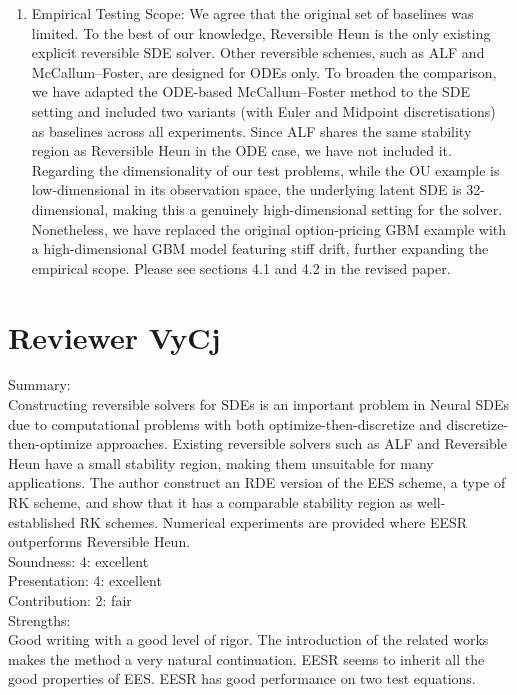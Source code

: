 \documentclass{article}
\begin{document}
\begin{enumerate}
    \item Empirical Testing Scope: We agree that the original set of baselines was limited. To the best of our knowledge, Reversible Heun is the only existing explicit reversible SDE solver. Other reversible schemes, such as ALF and McCallum–Foster, are designed for ODEs only. To broaden the comparison, we have adapted the ODE-based McCallum–Foster method to the SDE setting and included two variants (with Euler and Midpoint discretisations) as baselines across all experiments. Since ALF shares the same stability region as Reversible Heun in the ODE case, we have not included it. Regarding the dimensionality of our test problems, while the OU example is low-dimensional in its observation space, the underlying latent SDE is 32-dimensional, making this a genuinely high-dimensional setting for the solver. Nonetheless, we have replaced the original option-pricing GBM example with a high-dimensional GBM model featuring stiff drift, further expanding the empirical scope. Please see sections 4.1 and 4.2 in the revised paper.
\end{enumerate}

\section{Reviewer VyCj}

Summary:\\
Constructing reversible solvers for SDEs is an important problem in Neural SDEs due to computational problems with both optimize-then-discretize and discretize-then-optimize approaches. Existing reversible solvers such as ALF and Reversible Heun have a small stability region, making them unsuitable for many applications. The author construct an RDE version of the EES scheme, a type of RK scheme, and show that it has a comparable stability region as well-established RK schemes. Numerical experiments are provided where EESR outperforms Reversible Heun.\\

Soundness: 4: excellent\\
Presentation: 4: excellent\\
Contribution: 2: fair\\

Strengths:\\
Good writing with a good level of rigor. The introduction of the related works makes the method a very natural continuation.
EESR seems to inherit all the good properties of EES.
EESR has good performance on two test equations.\\
\end{document}
